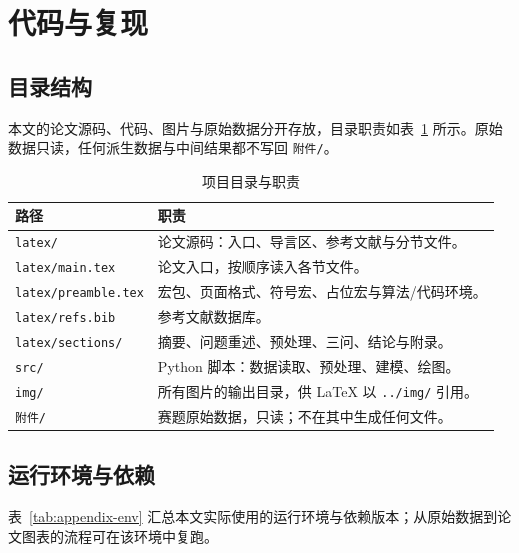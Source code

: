 
\section{代码与复现}

\subsection{目录结构}

本文的论文源码、代码、图片与原始数据分开存放，目录职责如表~\ref{tab:appendix-layout} 所示。原始数据只读，任何派生数据与中间结果都不写回 \texttt{附件/}。

\begin{table}[htbp]
  \centering
  \caption{项目目录与职责}
  \label{tab:appendix-layout}
  \small
  \begin{tabularx}{\textwidth}{@{}l X@{}}
    \toprule
    路径 & 职责 \\
    \midrule
    \texttt{latex/} & 论文源码：入口、导言区、参考文献与分节文件。 \\
    \texttt{latex/main.tex} & 论文入口，按顺序读入各节文件。 \\
    \texttt{latex/preamble.tex} & 宏包、页面格式、符号宏、占位宏与算法/代码环境。 \\
    \texttt{latex/refs.bib} & 参考文献数据库。 \\
    \texttt{latex/sections/} & 摘要、问题重述、预处理、三问、结论与附录。 \\
    \texttt{src/} & Python 脚本：数据读取、预处理、建模、绘图。 \\
    \texttt{img/} & 所有图片的输出目录，供 LaTeX 以 \texttt{../img/} 引用。 \\
    \texttt{附件/} & 赛题原始数据，只读；不在其中生成任何文件。 \\
    \bottomrule
  \end{tabularx}
\end{table}

\subsection{运行环境与依赖}

表~\ref{tab:appendix-env} 汇总本文实际使用的运行环境与依赖版本；从原始数据到论文图表的流程可在该环境中复跑。

